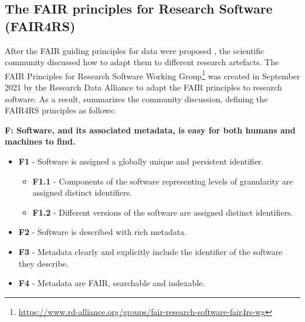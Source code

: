 
\subsection{The FAIR principles for Research Software (FAIR4RS)}
\label{subsec:fair4rs}


After the FAIR guiding principles for data were proposed \cite{wilkinson_fair_2016}, the scientific community discussed how to adapt them to different research artefacts. The FAIR Principles for Research Software Working Group\footnote{\url{https://www.rd-alliance.org/groups/fair-research-software-fair4rs-wg}} was created in September 2021 by the Research Data Alliance to adapt the FAIR principles to research software. As a result, \cite{chue_hong_neil_p_2022_6623556} summarizes the community discussion, defining the FAIR4RS principles as follows:


\textbf{F: Software, and its associated metadata, is easy for both humans and machines to find.}

\begin{itemize}
    \item \textbf{F1} - Software is assigned a globally unique and persistent identifier.
    \begin{itemize}
        \item \textbf{F1.1} - Components of the software representing levels of granularity are assigned distinct identifiers.
        \item \textbf{F1.2} - Different versions of the software are assigned distinct identifiers.
    \end{itemize}

    \item \textbf{F2} - Software is described with rich metadata.
    \item \textbf{F3} - Metadata clearly and explicitly include the identifier of the software they describe.
    \item \textbf{F4} - Metadata are FAIR, searchable and indexable.
\end{itemize}

